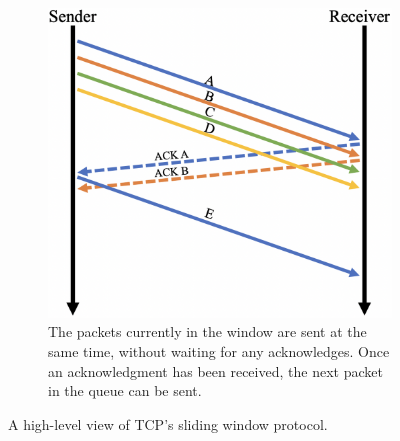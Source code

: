 \begin{figure}[htp]
\begin{subfigure}[b]{0.45\textwidth}
        \includegraphics[scale=0.3]{figures/slidingWindow2}
        \caption{The packets currently in the window are sent at the same time, without waiting for any acknowledges. Once an acknowledgment has been received, the next packet in the queue can be sent.}
    \end{subfigure}%
    \caption[The Sliding Window Protocol]{A high-level view of TCP's sliding window protocol.}
    \label{fig:slidingWindow}
\end{figure}
